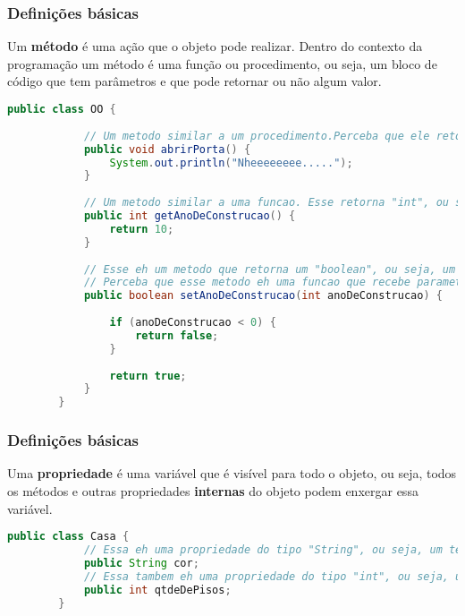 \begin{frame}[fragile]
\frametitle{Definições básicas}
	
	
	\par Um \textbf{método} é uma ação que o objeto pode realizar. Dentro do contexto da programação um método é uma função ou procedimento, ou seja, um bloco de código que tem parâmetros e que pode retornar ou não algum valor.
	\begin{lstlisting}[language=Java] 
		public class OO {
			
			// Um metodo similar a um procedimento.Perceba que ele retorna "void", ou seja, um valor vazio
			public void abrirPorta() {
				System.out.println("Nheeeeeeee.....");
			}
			
			// Um metodo similar a uma funcao. Esse retorna "int", ou seja, um numero inteiro
			public int getAnoDeConstrucao() {
				return 10;
			}
			
			// Esse eh um metodo que retorna um "boolean", ou seja, um valor verdadeiro ou falso.
			// Perceba que esse metodo eh uma funcao que recebe parametros
			public boolean setAnoDeConstrucao(int anoDeConstrucao) {
				
				if (anoDeConstrucao < 0) {
					return false;
				}
				
				return true;
			}
		}
	\end{lstlisting}

\end{frame}

\begin{frame}[fragile]
\frametitle{Definições básicas}
	
	\par Uma \textbf{propriedade} é uma variável que é visível para todo o objeto, ou seja, todos os métodos e outras propriedades \textbf{internas} do objeto podem enxergar essa variável.
	\begin{lstlisting}[language=Java]
		public class Casa {
			// Essa eh uma propriedade do tipo "String", ou seja, um texto
			public String cor;
			// Essa tambem eh uma propriedade do tipo "int", ou seja, um numero inteiro
			public int qtdeDePisos;
		}
	\end{lstlisting}
	
\end{frame}

